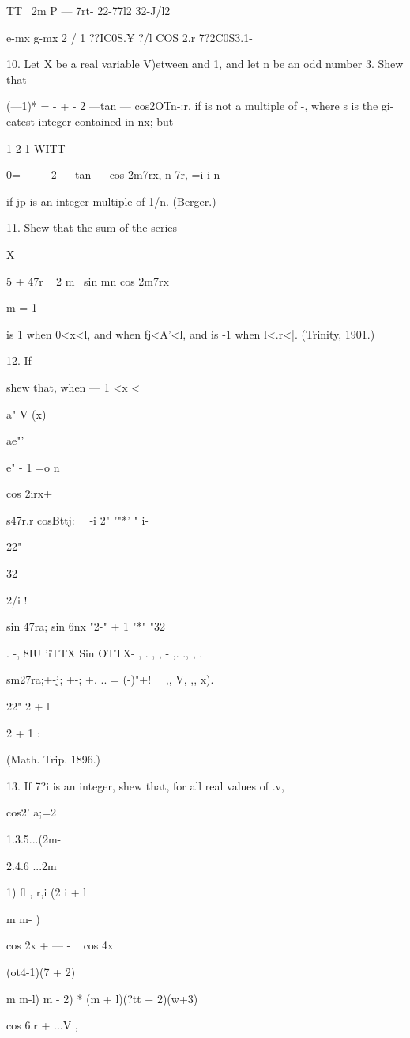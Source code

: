 {TT \ 2m P — 7rt- 22-77l2 32-J/l2

e-mx g-mx 2 / 1 ??IC0S.¥ ?/l COS 2.r 7?2C0S3.1- \

10. Let X be a real variable V)etween and 1, and let n be an odd
number 3. Shew that

(—1)* = - + - 2 —tan — cos2OTn-:r, if is not a multiple of -, where s
is the gi-eatest integer contained in nx; but

 1 2 1 WITT

0= - + - 2 — tan — cos 2m7rx, n 7r, =i i n

if jp is an integer multiple of 1/n. (Berger.)

11. Shew that the sum of the series

X

 5 + 47r ~ 2 m~ sin mn cos 2m7rx

m = 1

is 1 when 0<x<l, and when fj<A'<l, and is -1 when l<.r<|. (Trinity,
1901.)

12. If

shew that, when — 1 <x <\,

a" V (x)

ae"'

e" - 1 =o n

cos 2irx+

s47r.r cosBttj: \ \ -i 2" ""*' " i-

22"

32

2/i !

sin 47ra; sin 6nx "2-" + 1 "*" "32

. -, 8IU 'iTTX Sin OTTX- , . , , - ,. ., , .

sm27ra;+-j; +-; +. .. = (-)"+! \ \ ,, V, ,, x).

22" 2 + l

2 + 1 :

(Math. Trip. 1896.)

13. If 7?i is an integer, shew that, for all real values of .v,

cos2' a;=2

1.3.5...(2m-

2.4.6 ...2m

1) fl , r,i (2 i + l

m m- )

cos 2x + — - ~ cos 4x

(ot4-1)(7 + 2)

m m-l) m - 2) * (m + l)(?tt + 2)(w+3)

cos 6.r + ...V ,

}
